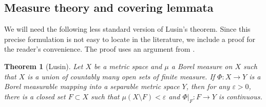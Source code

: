 \documentclass[12pt,leqno]{amsart}
\newtheorem{theorem}{Theorem}
\theoremstyle{definition}
\newcommand{\eps}{\varepsilon}
\numberwithin{theorem}{section} \numberwithin{equation}{section}
\begin{document}
\subsection{Measure theory and covering lemmata}
We will need the following less standard version of Lusin's theorem. Since this precise formulation is not easy to locate in the literature, we include a proof for the reader's convenience. The proof uses an argument from \cite{feldman}.
\begin{theorem}[Lusin]
\label{TH5}
Let $X$ be a metric space and $\mu$ a Borel measure on $X$ such that $X$ is a union of countably many open sets of finite measure. If $\Phi:X\to Y$ is a Borel measurable mapping into a separable metric space $Y$, then for any $\eps>0$, there is a closed set $F\subset X$ such that $\mu(X\setminus F)<\eps$ and $\Phi|_F:F\to Y$ is continuous.
\end{theorem}
\end{document}
